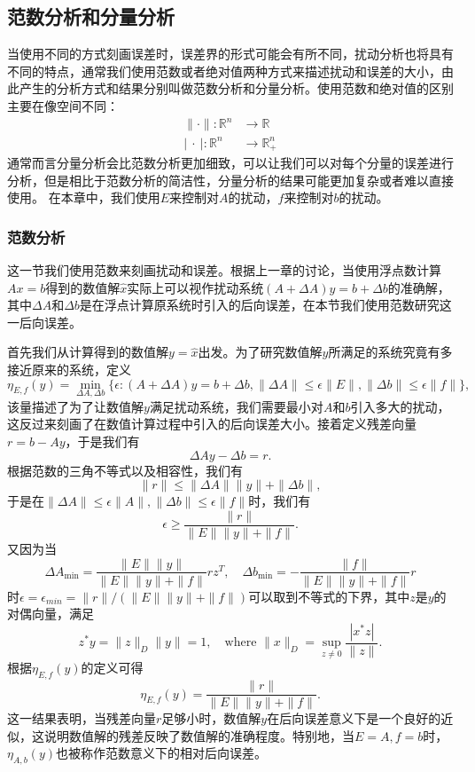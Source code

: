 \documentclass[a4paper,10pt]{ctexart}
\begin{document}
\subsection{范数分析和分量分析}
当使用不同的方式刻画误差时，误差界的形式可能会有所不同，扰动分析也将具有不同的特点，通常我们使用范数或者绝对值两种方式来描述扰动和误差的大小，由此产生的分析方式和结果分别叫做范数分析和分量分析。使用范数和绝对值的区别主要在像空间不同：
\[
    \begin{aligned}
        \| \cdot \| : \mathbb{R}^n &\to \mathbb{R} \\
        \left\vert\ \cdot \ \right\vert : \mathbb{R}^n &\to \mathbb{R}^n_+
    \end{aligned}
\]
通常而言分量分析会比范数分析更加细致，可以让我们可以对每个分量的误差进行分析，但是相比于范数分析的简洁性，分量分析的结果可能更加复杂或者难以直接使用。
在本章中，我们使用$ E $来控制对$ A $的扰动，$ f $来控制对$ b $的扰动。

\subsubsection{范数分析}
这一节我们使用范数来刻画扰动和误差。根据上一章的讨论，当使用浮点数计算$ Ax=b $得到的数值解$ \hat{x} $实际上可以视作扰动系统$ (A+\Delta A)y = b+\Delta b $的准确解，其中$ \Delta A $和$ \Delta b $是在浮点计算原系统时引入的后向误差，在本节我们使用范数研究这一后向误差。

首先我们从计算得到的数值解$ y=\hat{x} $出发。为了研究数值解$ y $所满足的系统究竟有多接近原来的系统，定义
\begin{equation}
    \eta_{E,f}(y) = \min_{\Delta A, \Delta b}\{ \epsilon: (A+\Delta A)y = b+\Delta b, \| \Delta A \|\leqslant \epsilon \| E \| , \| \Delta b \| \leqslant \epsilon \| f \| \},
\end{equation}
该量描述了为了让数值解$ y $满足扰动系统，我们需要最小对$ A $和$ b $引入多大的扰动，这反过来刻画了在数值计算过程中引入的后向误差大小。接着定义残差向量$ r = b - A y $，于是我们有
\[
    \Delta A y - \Delta b = r.
\]
根据范数的三角不等式以及相容性，我们有
\[
    \| r \| \leqslant \| \Delta A \| \| y \| + \| \Delta b \|,
\]
于是在$ \| \Delta A \|\leqslant \epsilon \| A \| , \| \Delta b \| \leqslant \epsilon \| f \| $时，我们有
\[
    \epsilon \geqslant \frac{\| r \|}{\| E \| \| y \| + \| f \|}.
\]
又因为当
\[
    \Delta A_{\min} = \frac{\| E \| \| y \|}{\| E \| \| y \| + \| f \| }rz^T, \quad \Delta b_{\min} = -\frac{\| f \|}{\| E \| \| y \| + \| f \| }r
\]
时$ \epsilon = \epsilon_{min} = \| r \|/(\| E \| \| y \| + \| f \|) $可以取到不等式的下界，其中$ z $是$ y $的对偶向量，满足
\[
    z^* y = \| z \|_D \| y \| = 1,\quad \text{where } \| x \|_D = \sup_{z\ne 0} \frac{|x^*z|}{\| z \| }.
\]
根据$ \eta_{E,f}(y) $的定义可得
\begin{equation}
    \eta_{E,f}(y) = \frac{\| r \|}{\| E \| \| y \| + \| f \|}.
\end{equation}
这一结果表明，当残差向量$ r $足够小时，数值解$ y $在后向误差意义下是一个良好的近似，这说明数值解的残差反映了数值解的准确程度。特别地，当$ E=A,f=b $时，$ \eta_{A,b}(y) $也被称作范数意义下的相对后向误差。
\end{document}
